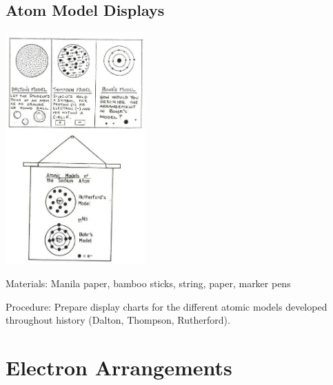 \begin{multicols}{2}
\subsection{Atom Model Displays}

\begin{center}
\includegraphics[width=0.4\textwidth]{./img/source/models-atom-str.jpg}
\end{center}

\begin{description*}
\item[Materials:]{Manila paper, bamboo sticks, string, paper, marker pens}
\item[Procedure:]{Prepare display charts for the different atomic models developed throughout history (Dalton, Thompson, Rutherford).}
\end{description*}


\section*{Electron Arrangements}




\end{multicols}
